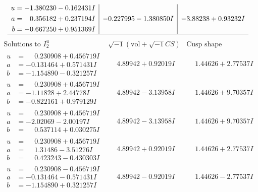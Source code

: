 \documentclass[1p]{elsarticle_modified}
\theoremstyle{definition}
\newcommand{\I}{\sqrt{-1}}
\begin{document}
$$\begin{array}{c|c|c}
\begin{aligned}
u &= -1.380230 - 0.162431 I \\
a &= \phantom{-}0.356182 + 0.237194 I \\
b &= -0.667250 + 0.951369 I\end{aligned}
 & -0.227995 - 1.380850 I & -3.88238 + 0.93232 I\\
 \hline 
 \end{array}$$\newpage$$\begin{array}{c|c|c}  
\text{Solutions to }I^u_{2}& \I (\text{vol} + \sqrt{-1}CS) & \text{Cusp shape}\\
 \hline 
\begin{aligned}
u &= \phantom{-}0.230908 + 0.456719 I \\
a &= -0.131464 + 0.571431 I \\
b &= -1.154890 - 0.321257 I\end{aligned}
 & \phantom{-}4.89942 + 0.92019 I & \phantom{-}1.44626 + 2.77537 I \\ \hline\begin{aligned}
u &= \phantom{-}0.230908 + 0.456719 I \\
a &= -1.11828 + 2.44778 I \\
b &= -0.822161 + 0.979129 I\end{aligned}
 & \phantom{-}4.89942 - 3.13958 I & \phantom{-}1.44626 + 9.70357 I \\ \hline\begin{aligned}
u &= \phantom{-}0.230908 + 0.456719 I \\
a &= -2.02069 - 2.00197 I \\
b &= \phantom{-}0.537114 + 0.030275 I\end{aligned}
 & \phantom{-}4.89942 - 3.13958 I & \phantom{-}1.44626 + 9.70357 I \\ \hline\begin{aligned}
u &= \phantom{-}0.230908 + 0.456719 I \\
a &= \phantom{-}1.31486 - 3.51276 I \\
b &= \phantom{-}0.423243 - 0.430303 I\end{aligned}
 & \phantom{-}4.89942 + 0.92019 I & \phantom{-}1.44626 + 2.77537 I \\ \hline\begin{aligned}
u &= \phantom{-}0.230908 - 0.456719 I \\
a &= -0.131464 - 0.571431 I \\
b &= -1.154890 + 0.321257 I\end{aligned}
 & \phantom{-}4.89942 - 0.92019 I & \phantom{-}1.44626 - 2.77537 I \\ \hline\begin{aligned}

\end{aligned}
\end{array}$$
\end{document}
